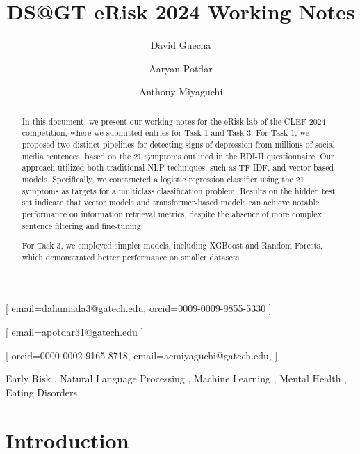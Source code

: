 \documentclass[]{style/ceurart}
\begin{document}


\title{DS@GT eRisk 2024 Working Notes}

\author[1]{David Guecha}[
email=dahumada3@gatech.edu,
orcid=0009-0009-9855-5330
]
\author[1]{Aaryan Potdar}[
email=apotdar31@gatech.edu
]
\author[1]{Anthony Miyaguchi}[
orcid=0000-0002-9165-8718,
email=acmiyaguchi@gatech.edu,
]
\cormark[1]

\address[1]{Georgia Institute of Technology, North Ave NW, Atlanta, GA 30332}


\begin{abstract}
In this document, we present our working notes for the eRisk lab of the CLEF 2024 competition, where we submitted entries for Task 1 and Task 3. For Task 1, we proposed two distinct pipelines for detecting signs of depression from millions of social media sentences, based on the 21 symptoms outlined in the BDI-II questionnaire. Our approach utilized both traditional NLP techniques, such as TF-IDF, and vector-based models. Specifically, we constructed a logistic regression classifier using the 21 symptoms as targets for a multiclass classification problem. Results on the hidden test set indicate that vector models and transformer-based models can achieve notable performance on information retrieval metrics, despite the absence of more complex sentence filtering and fine-tuning.

For Task 3, we employed simpler models, including XGBoost and Random Forests, which demonstrated better performance on smaller datasets.

\end{abstract}

\begin{keywords}
  Early Risk \sep
  Natural Language Processing \sep
  Machine Learning \sep
  Mental Health \sep
  Eating Disorders
\end{keywords}


\maketitle

\section{Introduction}
\end{document}
